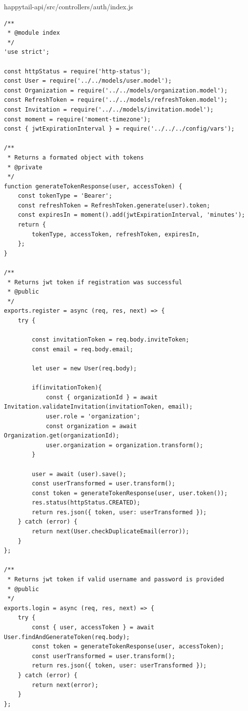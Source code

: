 \documentclass[12pt]{article}
\begin{document}
  \normalsize
 happytail-api/src/controllers/auth/index.js
 \footnotesize
\begin{verbatim}
/**
 * @module index
 */
'use strict';

const httpStatus = require('http-status');
const User = require('../../models/user.model');
const Organization = require('../../models/organization.model');
const RefreshToken = require('../../models/refreshToken.model');
const Invitation = require('../../models/invitation.model');
const moment = require('moment-timezone');
const { jwtExpirationInterval } = require('../../../config/vars');

/**
 * Returns a formated object with tokens
 * @private
 */
function generateTokenResponse(user, accessToken) {
    const tokenType = 'Bearer';
    const refreshToken = RefreshToken.generate(user).token;
    const expiresIn = moment().add(jwtExpirationInterval, 'minutes');
    return {
        tokenType, accessToken, refreshToken, expiresIn,
    };
}

/**
 * Returns jwt token if registration was successful
 * @public
 */
exports.register = async (req, res, next) => {
    try {

        const invitationToken = req.body.inviteToken;
        const email = req.body.email;

        let user = new User(req.body);

        if(invitationToken){
            const { organizationId } = await Invitation.validateInvitation(invitationToken, email);
            user.role = 'organization';
            const organization = await Organization.get(organizationId);
            user.organization = organization.transform();
        }

        user = await (user).save();
        const userTransformed = user.transform();
        const token = generateTokenResponse(user, user.token());
        res.status(httpStatus.CREATED);
        return res.json({ token, user: userTransformed });
    } catch (error) {
        return next(User.checkDuplicateEmail(error));
    }
};

/**
 * Returns jwt token if valid username and password is provided
 * @public
 */
exports.login = async (req, res, next) => {
    try {
        const { user, accessToken } = await User.findAndGenerateToken(req.body);
        const token = generateTokenResponse(user, accessToken);
        const userTransformed = user.transform();
        return res.json({ token, user: userTransformed });
    } catch (error) {
        return next(error);
    }
};


\end{verbatim}
\end{document}

